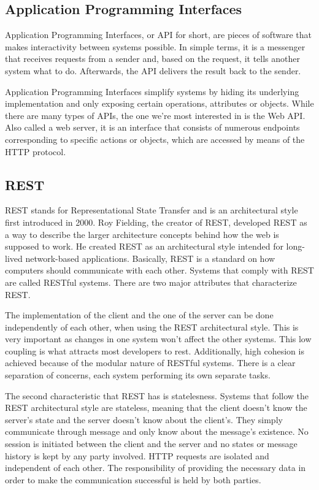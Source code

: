 \documentclass[12pt,a4paper,twoside]{report}
\begin{document}
\subsection{Application Programming Interfaces}
Application Programming Interfaces, or API for short, are pieces of software that makes interactivity between systems possible. In simple terms, it is a messenger that receives requests from a sender and, based on the request, it tells another system what to do. Afterwards, the API delivers the result back to the sender.

Application Programming Interfaces simplify systems by hiding its underlying implementation and only exposing certain operations, attributes or objects. While there are many types of APIs, the one we're most interested in is the Web API. Also called a web server, it is an interface that consists of numerous endpoints corresponding to specific actions or objects, which are accessed by means of the HTTP protocol. 

\subsection{REST}
REST stands for Representational State Transfer and is an architectural style first introduced in 2000. Roy Fielding, the creator of REST, developed REST as a way to describe the larger architecture concepts behind how the web is supposed to work. He created REST as an architectural style intended for long-lived network-based applications. Basically, REST is a standard on how computers should communicate with each other. Systems that comply with REST are called RESTful systems. There are two major attributes that characterize REST.

The implementation of the client and the one of the server can be done independently of each other, when using the REST architectural style. This is very important as changes in one system won't affect the other systems. This low coupling is what attracts most developers to rest. Additionally, high cohesion is achieved because of the modular nature of RESTful systems. There is a clear separation of concerns, each system performing its own separate tasks.

The second characteristic that REST has is statelesness. Systems that follow the REST architectural style are stateless, meaning that the client doesn't know the server's state and the server doesn't know about the client's. They simply communicate through message and only know about the message's existence. No session is initiated between the client and the server and no states or message history is kept by any party involved. HTTP requests are isolated and independent of each other. The responsibility of providing the necessary data in order to make the communication successful is held by both parties. 
\end{document}
